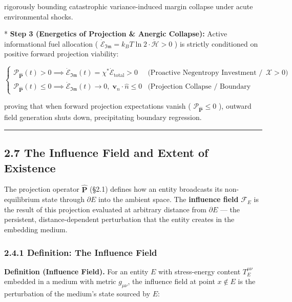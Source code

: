 \documentclass[11pt,a4paper]{article}
\theoremstyle{definition}\newtheorem{definition}{Definition}
\theoremstyle{remark}\newtheorem{remark}{Remark}
\begin{document}
rigorously bounding catastrophic variance-induced margin collapse under acute environmental shocks.

* \textbf{Step 3 (Energetics of Projection \& Anergic Collapse):}
Active informational fuel allocation ( $\dot{\mathcal{E}}_{\mathfrak{Im}} = k_B T \ln 2 \cdot \dot{\mathcal{H}} > 0$ ) is strictly conditioned on positive forward projection viability:


\begin{equation}
\boxed{\begin{cases}
\mathcal{P}_{\hat{\mathbf{P}}}(t) > 0 \implies \dot{\mathcal{E}}_{\mathfrak{Im}}(t) = \chi^* \dot{\mathcal{E}}_{\text{total}} > 0 & \text{(Proactive Negentropy Investment / Exploratory Expression } \boldsymbol{\mathcal{X}} > 0\text{)} \\
\mathcal{P}_{\hat{\mathbf{P}}}(t) \le 0 \implies \dot{\mathcal{E}}_{\mathfrak{Im}}(t) \longrightarrow 0, \; \mathbf{v}_n \cdot \hat{n} \le 0 & \text{(Projection Collapse / Boundary Regression and Radiative Dissipation)}
\end{cases}}
\end{equation}


proving that when forward projection expectations vanish ( $\mathcal{P}_{\hat{\mathbf{P}}} \le 0$ ), outward field generation shuts down, precipitating boundary regression.

\noindent\rule{\linewidth}{0.4pt}
\subsection{2.7 The Influence Field and Extent of Existence}

The projection operator $\hat{\mathbf{P}}$ (§2.1) defines how an entity broadcasts its non-equilibrium state through $\partial E$ into the ambient space. The \textbf{influence field} $\mathcal{F}_E$ is the result of this projection evaluated at arbitrary distance from $\partial E$ — the persistent, distance-dependent perturbation that the entity creates in the embedding medium.
\subsubsection{2.4.1 Definition: The Influence Field}

\textbf{Definition (Influence Field).} For an entity $E$ with stress-energy content $T^{\mu\nu}_E$ embedded in a medium with metric $g_{\mu\nu}$, the influence field at point $x \notin E$ is the perturbation of the medium's state sourced by $E$:
\end{document}
